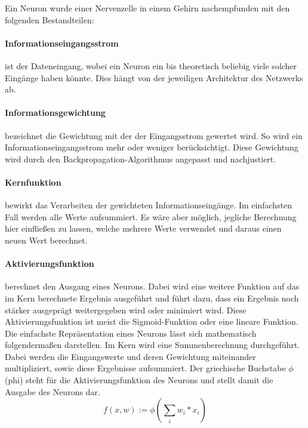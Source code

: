 \noindent 
Ein Neuron wurde einer Nervenzelle in einem Gehirn nachempfunden mit den folgenden Bestandteilen:
\paragraph{Informationseingangsstrom} ist der Dateneingang, wobei ein Neuron ein bis theoretisch beliebig viele solcher Eingänge haben könnte. 
Dies hängt von der jeweiligen Architektur des Netzwerks ab.

\paragraph{Informationsgewichtung} bezeichnet die Gewichtung mit der der Eingangsstrom gewertet wird. 
So wird ein Informationseingangsstrom mehr oder weniger berücksichtigt. 
Diese Gewichtung wird durch den Backpropagation-Algorithmus angepasst und nachjustiert.

\paragraph{Kernfunktion} bewirkt das Verarbeiten der gewichteten Informationseingänge. 
Im einfachsten Fall werden alle Werte aufsummiert. 
Es wäre aber möglich, jegliche Berechnung hier einfließen zu lassen, welche mehrere Werte verwendet und daraus einen neuen Wert berechnet.

\paragraph{Aktivierungsfunktion} berechnet den Ausgang eines Neurons. 
Dabei wird eine weitere Funktion auf das im Kern berechnete Ergebnis ausgeführt und führt dazu, dass ein Ergebnis noch stärker ausgeprägt weitergegeben wird oder minimiert wird. 
Diese Aktivierungsfunktion ist meist die Sigmoid-Funktion oder eine lineare Funktion. 
\\

\noindent 
Die einfachste Repräsentation eines Neurons lässt sich mathematisch folgendermaßen darstellen.
Im Kern wird eine Summenberechnung durchgeführt. 
Dabei werden die Eingangswerte und deren Gewichtung miteinander multipliziert, sowie diese Ergebnisse aufsummiert.
Der griechische Buchstabe $\phi$ (phi) steht für die Aktivierungsfunktion des Neurons und stellt damit die Ausgabe des Neurons dar.
\begin{equation}
	f(x, w) := \phi ( \sum\limits_{i}{w_i * x_i})
\end{equation}


